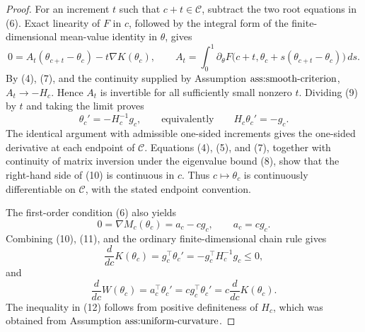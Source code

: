 \documentclass{article}
\begin{document}
\begin{proof}
For an increment \(t\) such that \(c+t\in\mathcal C\), subtract the two root equations in (6).  Exact linearity of \(F\) in \(c\), followed by the integral form of the finite-dimensional mean-value identity in \(\theta\), gives
\[
 0=A_t(\theta_{c+t}-\theta_c)-t\nabla K(\theta_c),
 \qquad
 A_t=\int_0^1\partial_\theta F\bigl(c+t,
       \theta_c+s(\theta_{c+t}-\theta_c)\bigr)\,ds.             \tag{9}
\]
By (4), (7), and the continuity supplied by Assumption \(\textnormal{ass:smooth-criterion}\), \(A_t\to-H_c\).  Hence \(A_t\) is invertible for all sufficiently small nonzero \(t\).  Dividing (9) by \(t\) and taking the limit proves
\[
 \theta_c'=-H_c^{-1}g_c,
 \qquad\text{equivalently}\qquad H_c\theta_c'=-g_c.            \tag{10}
\]
The identical argument with admissible one-sided increments gives the one-sided derivative at each endpoint of \(\mathcal C\).  Equations (4), (5), and (7), together with continuity of matrix inversion under the eigenvalue bound (8), show that the right-hand side of (10) is continuous in \(c\).  Thus \(c\mapsto\theta_c\) is continuously differentiable on \(\mathcal C\), with the stated endpoint convention.

The first-order condition (6) also yields
\[
 0=\nabla M_c(\theta_c)=a_c-cg_c,
 \qquad a_c=cg_c.                                               \tag{11}
\]
Combining (10), (11), and the ordinary finite-dimensional chain rule gives
\[
 \frac{d}{dc}K(\theta_c)
 =g_c^\top\theta_c'
 =-g_c^\top H_c^{-1}g_c\leq0,                                  \tag{12}
\]
and
\[
 \frac{d}{dc}W(\theta_c)
 =a_c^\top\theta_c'
 =c g_c^\top\theta_c'
 =c\frac{d}{dc}K(\theta_c).                                    \tag{13}
\]
The inequality in (12) follows from positive definiteness of \(H_c\), which was obtained from Assumption \(\textnormal{ass:uniform-curvature}\).


\end{proof}
\end{document}

